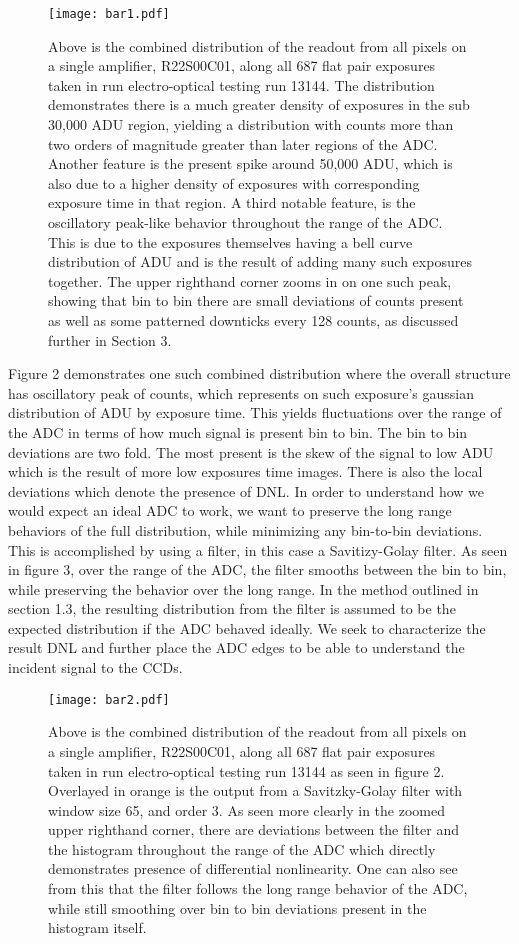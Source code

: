 \documentclass[11pt, letterpaper]{article}
\begin{document}
\begin{figure}
	\texttt{[image: bar1.pdf]}
	\caption{Above is the combined distribution of the readout from all pixels on a single amplifier, R22S00C01, along all 687 flat pair exposures taken in run electro-optical testing run 13144. The distribution demonstrates there is a much greater density of exposures in the sub 30,000 ADU region, yielding a distribution with counts more than two orders of magnitude greater than later regions of the ADC. Another feature is the present spike around 50,000 ADU, which is also due to a higher density of exposures with corresponding exposure time in that region. A third notable feature, is the oscillatory peak-like behavior throughout the range of the ADC. This is due to the exposures themselves having a bell curve distribution of ADU and is the result of adding many such exposures together. The upper righthand corner zooms in on one such peak, showing that bin to bin there are small deviations of counts present as well as some patterned downticks every 128 counts, as discussed further in Section 3.}
\end{figure}
\indent 

Figure 2 demonstrates one such combined distribution where the overall structure has oscillatory peak of counts, which represents on such exposure's gaussian distribution of ADU by exposure time. 
This yields fluctuations over the range of the ADC in terms of how much signal is present bin to bin. 
The bin to bin deviations are two fold. 
The most present is the skew of the signal to low ADU which is the result of more low exposures time images. 
There is also the local deviations which denote the presence of DNL. 
In order to understand how we would expect an ideal ADC to work, we want to preserve the long range behaviors of the full distribution, while minimizing any bin-to-bin deviations. 
This is accomplished by using a filter, in this case a Savitizy-Golay filter. 
As seen in figure 3, over the range of the ADC, the filter smooths between the bin to bin, while preserving the behavior over the long range. 
In the method outlined in section 1.3, the resulting distribution from the filter is assumed to be the expected distribution if the ADC behaved ideally. 
We seek to characterize the result DNL and further place the ADC edges to be able to understand the incident signal to the CCDs. 

\begin{figure}
	\texttt{[image: bar2.pdf]}
	\caption{Above is the combined distribution of the readout from all pixels on a single amplifier, R22S00C01, along all 687 flat pair exposures taken in run electro-optical testing run 13144 as seen in figure 2. Overlayed in orange is the output from a Savitzky-Golay filter with window size 65, and order 3. As seen more clearly in the zoomed upper righthand corner, there are deviations between the filter and the histogram throughout the range of the ADC which directly demonstrates presence of differential nonlinearity. One can also see from this that the filter follows the long range behavior of the ADC, while still smoothing over bin to bin deviations present in the histogram itself.}
\end{figure}
\end{document}
